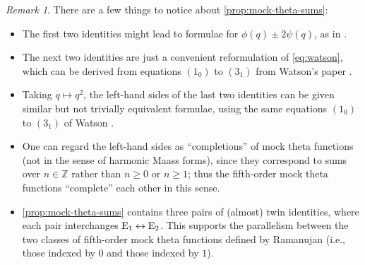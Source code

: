 \documentclass[reqno,11pt]{amsart}
\theoremstyle{definition}
\theoremstyle{remark}
\newtheorem*{remark}{Remark}
\numberwithin{equation}{section}
\newcommand{\Z}{\mathbb{Z}}
\newcommand{\E}{\textnormal E}
\begin{document}
\begin{remark}
There are a few things to notice about \cref{prop:mock-theta-sums}:
\begin{itemize}
    \item[(i).] The first two identities might lead to formulae for $\phi(q) \pm 2\psi(q)$, as in \cite[(1.4) and (1.5)]{chen2012partition}. 
    \item[(ii).] The next two identities are just a convenient reformulation of \cref{eq:watson}, which can be derived from equations $(1_0)$ to $(3_1)$ from Watson's paper \cite{watson1937mock}.
    \item[(iii).] Taking $q \mapsto q^2$, the left-hand sides of the last two identities can be given similar but not trivially equivalent formulae, using the same equations $(1_0)$ to $(3_1)$ of Watson \cite{watson1937mock}.
    \item[(iv).] One can regard the left-hand sides as ``completions'' of mock theta functions (not in the sense of harmonic Maass forms), since they correspond to sums over $n \in \Z$ rather than $n \ge 0$ or $n \ge 1$; thus the fifth-order mock theta functions ``complete'' each other in this sense.
    \item[(v).] \cref{prop:mock-theta-sums} contains three pairs of (almost) twin identities, where each pair interchanges $\E_1 \leftrightarrow \E_2$. This supports the parallelism between the two classes of fifth-order mock theta functions defined by Ramanujan (i.e., those indexed by $0$ and those indexed by $1$).
\end{itemize}
\end{remark}
\end{document}
